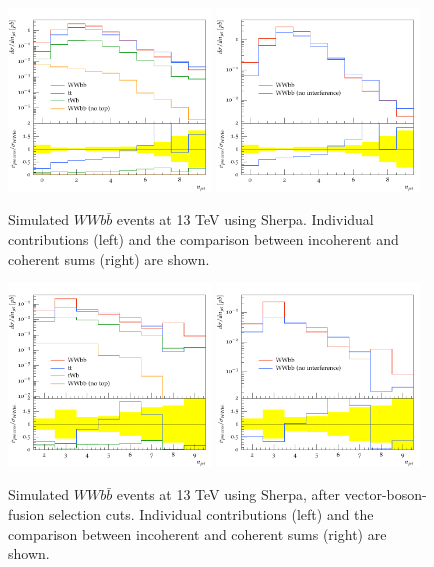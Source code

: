 \documentclass[11pt]{cernrep}
\begin{document}
\begin{figure}
\centering
	\includegraphics[width=0.48\textwidth]{WBF_njets_before_contribs.pdf}
	\includegraphics[width=0.48\textwidth]{WBF_njets_before.pdf}
\caption{\label{fig:wbf_before}
  Simulated $WWb\bar{b}$ events at 13 TeV using Sherpa.
  Individual contributions (left) and the comparison between incoherent and coherent sums (right) are shown.}
\end{figure}

\begin{figure}
\centering
	\includegraphics[width=0.48\textwidth]{WBF_njets_after_contribs.pdf}
	\includegraphics[width=0.48\textwidth]{WBF_njets_after.pdf}
\caption{\label{fig:wbf_after}
  Simulated $WWb\bar{b}$ events at 13 TeV using Sherpa, after vector-boson-fusion selection cuts. 
  Individual contributions (left) and the comparison between incoherent and coherent sums (right) are shown.}
\end{figure}
\end{document}
